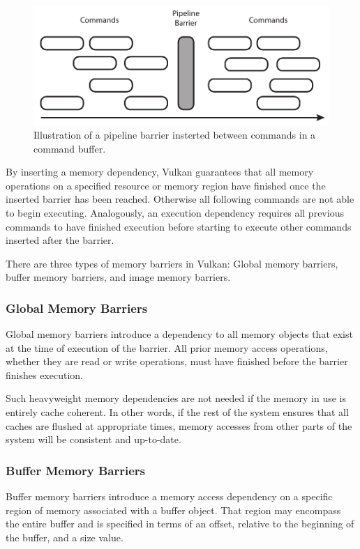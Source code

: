       \begin{figure}
        \centering
        \includegraphics[width=\textwidth]{Main/Images/PipelineBarrier}
        \caption{Illustration of a pipeline barrier insterted between commands in a command buffer.}
        \label{fig:PipelineBarrier}
      \end{figure}

      By inserting a memory dependency, Vulkan guarantees that all memory operations on a specified resource or memory region have finished once the inserted barrier has been reached.
      Otherwise all following commands are not able to begin executing.
      Analogously, an execution dependency requires all previous commands to have finished execution before starting to execute other commands inserted after the barrier.

      There are three types of memory barriers in Vulkan: Global memory barriers, buffer memory barriers, and image memory barriers.

      \subsubsection{Global Memory Barriers}
        Global memory barriers introduce a dependency to all memory objects that exist at the time of execution of the barrier.
        All prior memory access operations, whether they are read or write operations, must have finished before the barrier finishes execution.

        Such heavyweight memory dependencies are not needed if the memory in use is entirely cache coherent.
        In other words, if the rest of the system ensures that all caches are flushed at appropriate times, memory accesses from other parts of the system will be consistent and up-to-date.

      \subsubsection{Buffer Memory Barriers}
        Buffer memory barriers introduce a memory access dependency on a specific region of memory associated with a buffer object.
        That region may encompass the entire buffer and is specified in terms of an offset, relative to the beginning of the buffer, and a size value.

